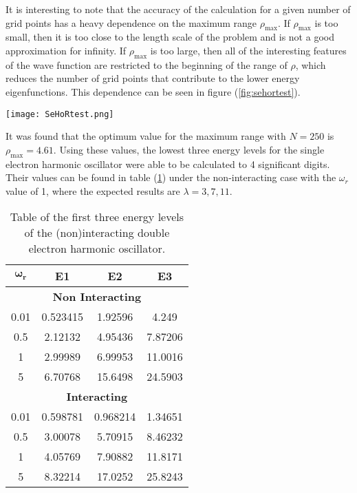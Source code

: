 \documentclass[a4paper,12pt]{report}
\begin{document}
It is interesting to note that the accuracy of the calculation for a given number of grid points has a heavy dependence on the maximum range $\rho_{\mathrm{max}}$. If $\rho_{\mathrm{max}}$ is too small, then it is too close to the length scale of the problem and is not a good approximation for infinity. If $\rho_{\mathrm{max}}$ is too large, then all of the interesting features of the wave function are restricted to the beginning of the range of $\rho$, which reduces the number of grid points that contribute to the lower energy eigenfunctions. This dependence can be seen in figure (\ref{fig:sehortest}).

\begin{SCfigure}
\centering
 \texttt{[image: SeHoRtest.png]}
 \caption{Plot of the $\chi^2$ function vs $\rho_{\mathrm{max}}$ in the region where eigenvalues reach an accuracy of 4 significant digits. Used $N = 250$.}
 \label{fig:sehortest}
\end{SCfigure}

It was found that the optimum value for the maximum range with $N = 250$ is $\rho_{\mathrm{max}} = 4.61$. Using these values, the lowest three energy levels for the single electron harmonic oscillator were able to be calculated to 4 significant digits. Their values can be found in table (\ref{tbl:dehoeval}) under the non-interacting case with the $\omega_r$ value of 1, where the expected results are $\lambda = 3,7,11$.

\begin{table}[h]
 \centering
\begin{center}
\begin{tabular}{|c|c|c|c|}\hline
$\mathbf{\omega_r}$ & \textbf{E1} & \textbf{E2} & \textbf{E3}\\\hline
\multicolumn{4}{|c|}{\textbf{Non Interacting}} \\\hline
0.01 & 0.523415 & 1.92596 & 4.249 \\\hline
0.5 & 2.12132 & 4.95436 & 7.87206 \\\hline
1 & 2.99989 & 6.99953 & 11.0016 \\\hline
5 & 6.70768 & 15.6498 & 24.5903 \\\hline
\multicolumn{4}{|c|}{\textbf{Interacting}} \\\hline
0.01 & 0.598781 & 0.968214 & 1.34651 \\\hline
0.5 & 3.00078 & 5.70915 & 8.46232 \\\hline
1 & 4.05769 & 7.90882 & 11.8171 \\\hline
5 & 8.32214 & 17.0252 & 25.8243 \\\hline
\end{tabular}
\end{center}
\caption{Table of the first three energy levels of the (non)interacting double electron harmonic oscillator.\label{tbl:dehoeval}}
\end{table}
\end{document}
